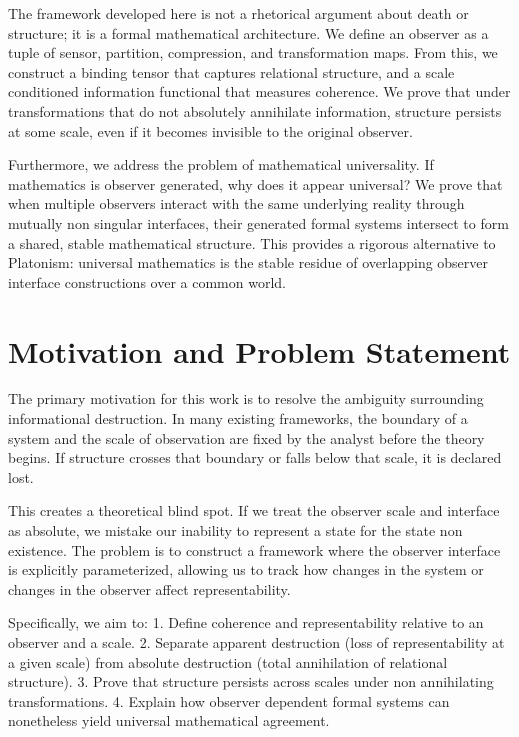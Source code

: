 \documentclass[12pt]{article}
\theoremstyle{definition}
\begin{document}
The framework developed here is not a rhetorical argument about death or structure; it is a formal mathematical architecture. We define an observer as a tuple of sensor, partition, compression, and transformation maps. From this, we construct a binding tensor that captures relational structure, and a scale conditioned information functional that measures coherence. We prove that under transformations that do not absolutely annihilate information, structure persists at some scale, even if it becomes invisible to the original observer. 

Furthermore, we address the problem of mathematical universality. If mathematics is observer generated, why does it appear universal? We prove that when multiple observers interact with the same underlying reality through mutually non singular interfaces, their generated formal systems intersect to form a shared, stable mathematical structure. This provides a rigorous alternative to Platonism: universal mathematics is the stable residue of overlapping observer interface constructions over a common world.

\section{Motivation and Problem Statement}

The primary motivation for this work is to resolve the ambiguity surrounding informational destruction. In many existing frameworks, the boundary of a system and the scale of observation are fixed by the analyst before the theory begins. If structure crosses that boundary or falls below that scale, it is declared lost. 

This creates a theoretical blind spot. If we treat the observer scale and interface as absolute, we mistake our inability to represent a state for the state non existence. The problem is to construct a framework where the observer interface is explicitly parameterized, allowing us to track how changes in the system or changes in the observer affect representability.

Specifically, we aim to:
1. Define coherence and representability relative to an observer and a scale.
2. Separate apparent destruction (loss of representability at a given scale) from absolute destruction (total annihilation of relational structure).
3. Prove that structure persists across scales under non annihilating transformations.
4. Explain how observer dependent formal systems can nonetheless yield universal mathematical agreement.
\end{document}
